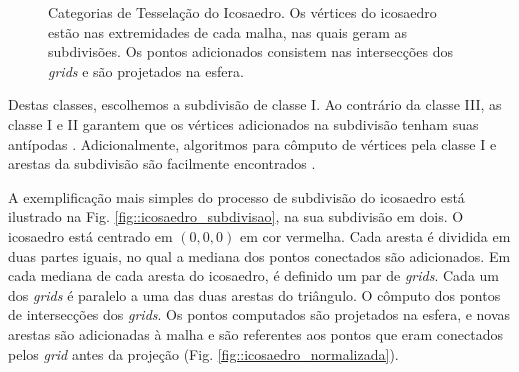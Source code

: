 \documentclass[
    12pt,                %
    oneside,            %
    a4paper,            %
    english,            %
    french,                %
    spanish,            %
    brazil                %
    ]{abntex2}
\begin{document}
\begin{figure}[ht]
\centering
\captionsetup[subfloat]{farskip=0pt,nearskip=0pt}
\centering
    \hspace{1em}
    \hspace{1em}
    \caption{Categorias de Tesselação do Icosaedro. Os vértices do icosaedro estão nas extremidades de cada malha, nas quais geram as subdivisões. Os pontos adicionados consistem nas intersecções dos \textit{grids} e são projetados na esfera.}
    \label{fig::classe_tesselacao}
\end{figure}

Destas classes, escolhemos a subdivisão de classe I. Ao contrário da classe III, as classe I e II garantem que os vértices adicionados na subdivisão tenham suas antípodas \cite{popko2012}. Adicionalmente, algoritmos para cômputo de vértices pela classe I e arestas da subdivisão são facilmente encontrados \cite{luna2012}.

A exemplificação mais simples do processo de subdivisão do icosaedro está ilustrado na Fig. \ref{fig::icosaedro_subdivisao}, na sua subdivisão em dois. O icosaedro está centrado em $(0,0,0)$ em cor vermelha. Cada aresta é dividida em duas partes iguais, no qual a mediana dos pontos conectados são adicionados. Em cada mediana de cada aresta do icosaedro, é definido um par de \textit{grids}. Cada um dos \textit{grids} 
é paralelo a uma das duas arestas do triângulo. O cômputo dos pontos de intersecções dos \textit{grids}. Os pontos computados são projetados na esfera, e novas arestas são adicionadas à malha e são referentes aos pontos que eram conectados pelos \textit{grid} antes da projeção (Fig. \ref{fig::icosaedro_normalizada}).
\end{document}
